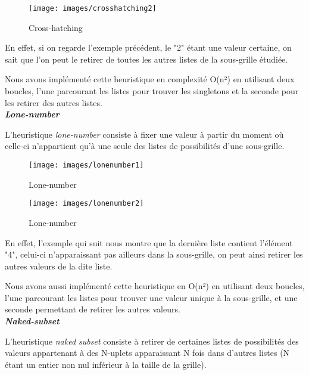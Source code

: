\documentclass[a4paper, 12pt]{article}
\begin{document}
	\begin{figure}[H]
		\caption{Cross-hatching}
		\centering
		\texttt{[image: images/crosshatching2]}
	\end{figure}

	\par En effet, si on regarde l'exemple précédent, le "2" étant une valeur certaine, on sait que l'on peut le retirer de toutes les autres listes de la sous-grille étudiée.
	\par Nous avons implémenté cette heuristique en complexité O(n²) en utilisant deux boucles, l'une parcourant les listes pour trouver les singletons et la seconde pour les retirer
des autres listes.\\
	
	\textit{\textbf{Lone-number}}

	\par L'heuristique \textit{lone-number} consiste à fixer une valeur à partir du moment où celle-ci n'appartient qu'à une seule des listes de possibilités d'une sous-grille.\\

	\begin{figure}[H]
		\caption{Lone-number}
		\centering
		\texttt{[image: images/lonenumber1]}
	\end{figure}

	\begin{figure}[H]
		\caption{Lone-number}
		\centering
		\texttt{[image: images/lonenumber2]}
	\end{figure}

	\par En effet, l'exemple qui suit nous montre que la dernière liste contient l'élément "4", celui-ci n'apparaissant pas ailleurs dans la sous-grille, on peut ainsi
retirer les autres valeurs de la dite liste.
	\par Nous avons aussi implémenté cette heuristique en O(n²) en utilisant deux boucles, l'une parcourant les listes pour trouver une valeur unique à la sous-grille, et une seconde
permettant de retirer les autres valeurs.\\

	\textit{\textbf{Naked-subset}}


	\par L'heuristique \textit{naked subset} consiste à retirer de certaines listes de possibilités des valeurs appartenant à des N-uplets apparaissant N fois dans d'autres listes (N étant un entier non nul inférieur à la taille de la grille).
\end{document}
